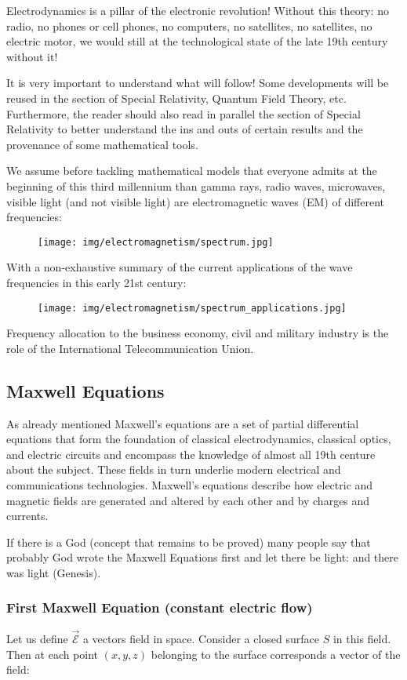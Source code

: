 	Electrodynamics is a pillar of the electronic revolution! Without this theory: no radio, no phones or cell phones, no computers, no satellites, no satellites, no electric motor, we would still at the technological state of the late 19th century without it!
	\begin{tcolorbox}[title=Remark,colframe=black,arc=10pt]
	It is very important to understand what will follow! Some developments will be reused in the section of Special Relativity, Quantum Field Theory, etc. Furthermore, the reader should also read in parallel the section of Special Relativity to better understand the ins and outs of certain results and the provenance of some mathematical tools.
	\end{tcolorbox}
	We assume before tackling mathematical models that everyone admits at the beginning of this third millennium than gamma rays, radio waves, microwaves, visible light (and not visible light) are electromagnetic waves (EM) of different frequencies:
	\begin{figure}[H]
		\centering
		\texttt{[image: img/electromagnetism/spectrum.jpg]}
	\end{figure}
	With a non-exhaustive summary of the current applications of the wave frequencies in this early 21st century:
	\begin{figure}[H]
		\centering
		\texttt{[image: img/electromagnetism/spectrum\_applications.jpg]}
	\end{figure}
	Frequency allocation to the business economy, civil and military industry is the role of the International Telecommunication Union.
	
	\subsection{Maxwell Equations}
	As already mentioned Maxwell's equations are a set of partial differential equations that form the foundation of classical electrodynamics, classical optics, and electric circuits and encompass the knowledge of almost all 19th centure about the subject. These fields in turn underlie modern electrical and communications technologies. Maxwell's equations describe how electric and magnetic fields are generated and altered by each other and by charges and currents.
	
	If there is a God (concept that remains to be proved) many people say that probably God wrote the Maxwell Equations first and let there be light: and there was light (Genesis).
	
	\subsubsection{First Maxwell Equation (constant electric flow)}
	Let us define $\vec{\mathcal{E}}$ a vectors field in space. Consider a closed surface $S$ in this field. Then at each point $(x, y, z)$ belonging to the surface corresponds a vector of the field:
	
